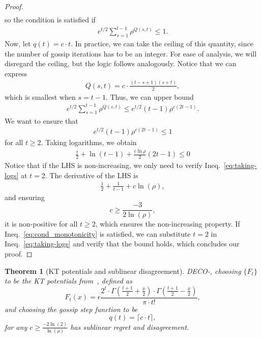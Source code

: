 \documentclass[journal]{IEEEtran} %
\newtheorem{theorem}{Theorem}
\newcommand{\br}[1]{\left(#1\right)}
\newcommand{\algname}{{DECO}\xspace}
\begin{document}
\begin{proof}
\begin{align*}
    \end{align*}
    so the condition is satisfied if
    \begin{align*}
        e^{t/2}\sum_{s=1}^{t-1} \rho^{Q(s,t)} \leq 1.
    \end{align*}
    Now, let $q(t) = c \cdot t$.
    In practice, we can take the ceiling of this quantity, since the number of gossip iterations has to be an integer.
    For ease of analysis, we will disregard the ceiling, but the logic follows analogously.
    Notice that we can express
    \begin{align}
        Q(s,t) = c \cdot \frac{(t-s+1)(s+t)}{2},
    \end{align}
    which is smallest when $s=t-1$.
    Thus, we can upper bound
    \begin{align*}
        e^{t/2} \sum_{s=1}^{t-1} \rho^{Q(s,t)} \leq e^{t/2} (t-1) \rho^{c(2t-1)}.
    \end{align*}
    We want to ensure that
    \begin{align*}
        e^{t/2} (t-1) \rho^{c(2t-1)} \leq 1
    \end{align*}
    for all $t \geq 2$.
    Taking logarithms, we obtain
    \begin{align}
        \frac{t}{2} + \ln(t-1) + \frac{c\ln \rho}{2}(2t-1) \leq 0 \label{eq:taking-logs}
    \end{align}
    Notice that if the LHS is non-increasing, we only need to verify Ineq.~\eqref{eq:taking-logs} at $t=2$.
    The derivative of the LHS is
    \begin{align*}
        \frac{1}{2} + \frac{1}{t-1} + c\ln(\rho),
    \end{align*}
    and ensuring
    \begin{equation}
        c \geq \frac{-3}{2\ln(\rho)}, \label{eq:cond_monotonicity}
    \end{equation}
    it is non-positive for all $t \geq 2$, which ensures the non-increasing property.
    If Ineq.~\eqref{eq:cond_monotonicity} is satisfied, we can substitute $t=2$ in Ineq.~\eqref{eq:taking-logs} and verify that the bound holds, which concludes our proof.
\end{proof}
\begin{theorem}[KT potentials and sublinear disagreement]\label{thm:KT-disagreement}
    \algname{}-, choosing $\{F_t\}$ to be the KT potentials from~, defined as
    \begin{equation}
        F_t(x) = \epsilon \frac{2^t \cdot \Gamma\br{\frac{t+1}{2} + \frac{x}{2}} \cdot \Gamma\br{\frac{t+1}{2} - \frac{x}{2}}}{\pi \cdot t!},
    \end{equation}
    and choosing the gossip step function to be
    \begin{equation}
        q(t) = \lceil c \cdot t \rceil,
    \end{equation}
    for any $c \geq \frac{-2\ln(2)}{\ln(\rho)}$ has sublinear regret and disagreement.
\end{theorem}
\end{document}
